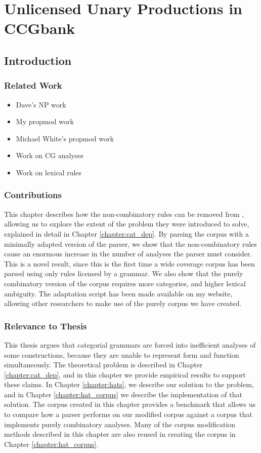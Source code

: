 \chapter{Unlicensed Unary Productions in CCGbank}
\label{chapter:nounary}
\section{Introduction}

\subsection{Related Work}

\begin{itemize}
 \item Dave's NP work
 \item My propmod work
 \item Michael White's propmod work
 \item Work on CG analyses
 \item Work on lexical rules
\end{itemize}


\subsection{Contributions}

This chapter describes how the non-combinatory rules can be removed from \ccgbank, allowing us to explore the extent of the problem they were introduced to solve, explained in detail in Chapter \ref{chapter:cat_dep}. By parsing the corpus with a minimally adapted version of the \candc parser, we show that the non-combinatory rules cause an enormous increase in the number of analyses the parser must consider. This is a novel result, since this is the first time a wide coverage corpus has been parsed using only rules licensed by a \ccg grammar. We also show that the purely combinatory version of the corpus requires more categories, and higher lexical ambiguity. The adaptation script has been made available on my website, allowing other researchers to make use of the purely \ccg corpus we have created.

\subsection{Relevance to Thesis}

This thesis argues that categorial grammars are forced into inefficient analyses of some constructions, because they are unable to represent form and function simultaneously. The theoretical problem is described in Chapter \ref{chapter:cat_dep}, and in this chapter we provide empirical results to support these claims. In Chapter \ref{chapter:hats}, we describe our solution to the problem, and in Chapter \ref{chapter:hat_corpus} we describe the implementation of that solution. The corpus created in this chapter provides a benchmark that allows us to compare how a parser performs on our modified corpus against a corpus that implements purely combinatory analyses. Many of the corpus modification methods described in this chapter are also reused in creating the corpus in Chapter \ref{chapter:hat_corpus}.

